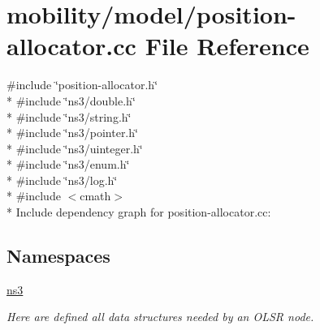 \hypertarget{position-allocator_8cc}{}\section{mobility/model/position-\/allocator.cc File Reference}
\label{position-allocator_8cc}
{\ttfamily \#include \char`\"{}position-\/allocator.\+h\char`\"{}}\\*
{\ttfamily \#include \char`\"{}ns3/double.\+h\char`\"{}}\\*
{\ttfamily \#include \char`\"{}ns3/string.\+h\char`\"{}}\\*
{\ttfamily \#include \char`\"{}ns3/pointer.\+h\char`\"{}}\\*
{\ttfamily \#include \char`\"{}ns3/uinteger.\+h\char`\"{}}\\*
{\ttfamily \#include \char`\"{}ns3/enum.\+h\char`\"{}}\\*
{\ttfamily \#include \char`\"{}ns3/log.\+h\char`\"{}}\\*
{\ttfamily \#include $<$cmath$>$}\\*
Include dependency graph for position-\/allocator.cc\+:
\subsection*{Namespaces}
\begin{DoxyCompactItemize}
\item 
 \hyperlink{namespacens3}{ns3}
\begin{DoxyCompactList}\small\item\em Here are defined all data structures needed by an O\+L\+SR node. \end{DoxyCompactList}\end{DoxyCompactItemize}

